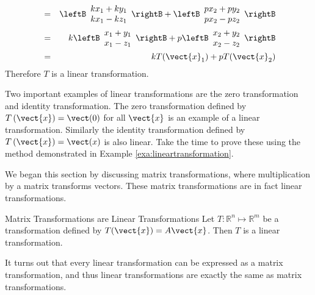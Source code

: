 \begin{solution}
\begin{eqnarray*}
&=& \leftB\begin{array}{c} kx_1 + ky_1 \\ kx_1 - kz_1 \end{array}\rightB + \leftB \begin{array}{c} px_2 + py_2 \\  px_2 - pz_2 \end{array}\rightB \\
&=& k \leftB\begin{array}{c} x_1 + y_1 \\ x_1 - z_1 \end{array}\rightB + p \leftB \begin{array}{c} x_2 + y_2 \\  x_2 - z_2 \end{array}\rightB \\
&=& k T(\vect{x}_1) + p T(\vect{x}_2) 
\end{eqnarray*}
Therefore $T$ is a linear transformation. 
\end{solution}

Two important examples of linear transformations are the zero transformation and identity transformation. The zero transformation defined by $T\left( \vect{x} \right) = \vect(0)$ for all $\vect{x}$ is an example of a linear transformation. Similarly the identity transformation defined by $T\left( \vect{x} \right) = \vect(x)$ is also linear. Take the time to prove these using the method demonstrated in Example \ref{exa:lineartransformation}.  

We began this section by discussing matrix transformations, where multiplication by a matrix transforms vectors. These matrix transformations are in fact linear transformations. 

\begin{theorem}{Matrix Transformations are Linear Transformations}\label{thm:matrixarelinear}
Let $T:\mathbb{R}^{n}\mapsto \mathbb{R}^{m}$ be a transformation defined by $T(\vect{x}) = A\vect{x}$. Then $T$ is a linear transformation. 
\end{theorem}

It turns out that every linear transformation can be expressed as a matrix transformation, and thus linear transformations are exactly the same as matrix transformations. 